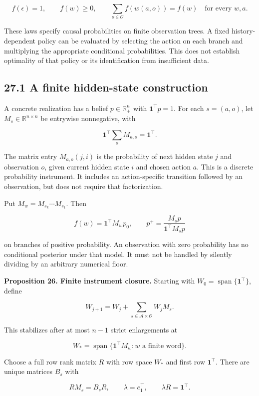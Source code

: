 \documentclass[11pt,letterpaper]{article}
\begin{document}
\[
f(\epsilon)=1,\qquad f(w)\geq0,\qquad
\sum_{o\in\mathcal O}f(w(a,o))=f(w)
\quad\text{for every }w,a.
\]

These laws specify causal probabilities on finite observation trees. A
fixed history-dependent policy can be evaluated by selecting the action
on each branch and multiplying the appropriate conditional
probabilities. This does not establish optimality of that policy or its
identification from insufficient data.

\subsection{27.1 A finite hidden-state
construction}\label{a-finite-hidden-state-construction}

A concrete realization has a belief \(p\in\mathbb R^n_+\) with
\(\mathbf1^\top p=1\). For each \(s=(a,o)\), let
\(M_s\in\mathbb R^{n\times n}\) be entrywise nonnegative, with

\[
\mathbf1^\top\sum_oM_{a,o}=\mathbf1^\top.
\]

The matrix entry \(M_{a,o}(j,i)\) is the probability of next hidden
state \(j\) and observation \(o\), given current hidden state \(i\) and
chosen action \(a\). This is a discrete probability instrument. It
includes an action-specific transition followed by an observation, but
does not require that factorization.

Put \(M_w=M_{s_k}\cdots M_{s_1}\). Then

\[
f(w)=\mathbf1^\top M_wp_0,\qquad
p^+=\frac{M_sp}{\mathbf1^\top M_sp}
\]

on branches of positive probability. An observation with zero
probability has no conditional posterior under that model. It must not
be handled by silently dividing by an arbitrary numerical floor.

\textbf{Proposition 26. Finite instrument closure.} Starting with
\(W_0=\operatorname{span}\{\mathbf1^\top\}\), define

\[
W_{j+1}=W_j+\sum_{s\in\mathcal A\times\mathcal O}W_jM_s.
\]

This stabilizes after at most \(n-1\) strict enlargements at

\[
W_* = \operatorname{span}\{\mathbf1^\top M_w:w\text{ a finite word}\}.
\]

Choose a full row rank matrix \(R\) with row space \(W_*\) and first row
\(\mathbf1^\top\). There are unique matrices \(B_s\) with

\[
RM_s=B_sR,\qquad \lambda=e_1^\top,\qquad \lambda R=\mathbf1^\top.
\]
\end{document}
